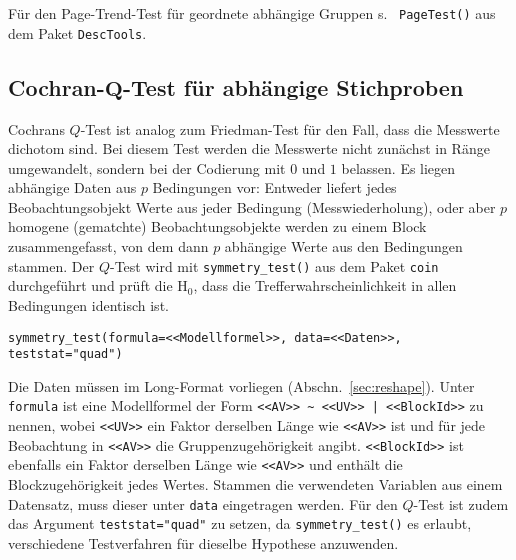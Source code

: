 Für den Page-Trend-Test für geordnete abhängige Gruppen s.\  \lstinline!PageTest()! aus dem Paket  \lstinline!DescTools!.

\subsection[Cochran-\texorpdfstring{$Q$}{Q}-Test für abhängige Stichproben]{Cochran-$\bm{Q}$-Test für abhängige Stichproben}
\label{sec:cochranQ}

Cochrans $Q$-Test ist analog zum Friedman-Test für den Fall, dass die Messwerte dichotom sind. Bei diesem Test werden die Messwerte nicht zunächst in Ränge umgewandelt, sondern bei der Codierung mit $0$ und $1$ belassen. Es liegen abhängige Daten aus $p$ Bedingungen vor: Entweder liefert jedes Beobachtungsobjekt Werte aus jeder Bedingung (Messwiederholung), oder aber $p$ homogene (gematchte) Beobachtungsobjekte werden zu einem Block zusammengefasst, von dem dann $p$ abhängige Werte aus den Bedingungen stammen. Der $Q$-Test wird mit \lstinline!symmetry_test()! aus dem Paket \lstinline!coin! durchgeführt und prüft die $\text{H}_{0}$, dass die Trefferwahrscheinlichkeit in allen Bedingungen identisch ist.
\begin{lstlisting}
symmetry_test(formula=<<Modellformel>>, data=<<Daten>>, teststat="quad")
\end{lstlisting}

Die Daten müssen im Long-Format vorliegen (Abschn.\ \ref{sec:reshape}). Unter \lstinline!formula! ist eine Modellformel der Form \lstinline!<<AV>> ~ <<UV>> | <<BlockId>>! zu nennen, wobei \lstinline!<<UV>>! ein Faktor derselben Länge wie \lstinline!<<AV>>! ist und für jede Beobachtung in \lstinline!<<AV>>! die Gruppenzugehörigkeit angibt. \lstinline!<<BlockId>>! ist ebenfalls ein Faktor derselben Länge wie \lstinline!<<AV>>! und enthält die Blockzugehörigkeit jedes Wertes. Stammen die verwendeten Variablen aus einem Datensatz, muss dieser unter \lstinline!data! eingetragen werden. Für den $Q$-Test ist zudem das Argument \lstinline!teststat="quad"! zu setzen, da \lstinline!symmetry_test()! es erlaubt, verschiedene Testverfahren für dieselbe Hypothese anzuwenden.

